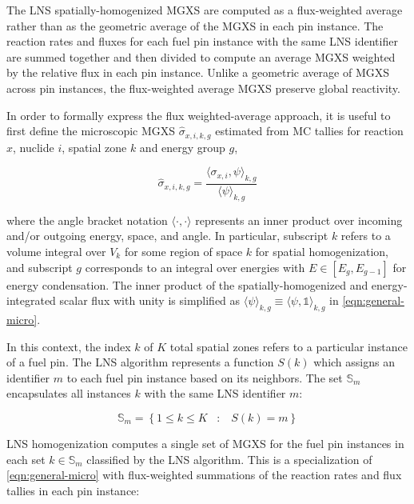 The LNS spatially-homogenized MGXS are computed as a flux-weighted average rather than as the geometric average of the MGXS in each pin instance. The reaction rates and fluxes for each fuel pin instance with the same LNS identifier are summed together and then divided to compute an average MGXS weighted by the relative flux in each pin instance. Unlike a geometric average of MGXS across pin instances, the flux-weighted average MGXS preserve global reactivity.


In order to formally express the flux weighted-average approach, it is useful to first define the microscopic MGXS $\hat{\sigma}_{x,i,k,g}$ estimated from MC tallies for reaction $x$, nuclide $i$, spatial zone $k$ and energy group $g$,

\begin{equation}
\label{eqn:general-micro}
\hat{\sigma}_{x,i,k,g} = \frac{\langle \sigma_{x,i}, \psi \rangle_{k,g}}{\langle \psi \rangle_{k,g}}
\end{equation}

\noindent where the angle bracket notation $\langle \cdot , \cdot \rangle$ represents an inner product over incoming and/or outgoing energy, space, and angle. In particular, subscript $k$ refers to a volume integral over $V_{k}$ for some region of space $k$ for spatial homogenization, and subscript $g$ corresponds to an integral over energies with $E \in [E_{g}, E_{g-1}]$ for energy condensation. The inner product of the spatially-homogenized and energy-integrated scalar flux with unity is simplified as $\langle \psi \rangle_{k,g} \equiv \langle \psi, \mathbb{1} \rangle_{k,g}$ in \autoref{eqn:general-micro}.

In this context, the index $k$ of $K$ total spatial zones refers to a particular instance of a fuel pin. The LNS algorithm represents a function $S(k)$ which assigns an identifier $m$ to each fuel pin instance based on its neighbors. The set $\mathbb{S}_{m}$ encapsulates all instances $k$ with the same LNS identifier $m$:

\begin{equation}
\label{eqn:lns-set}
\mathbb{S}_{m} = \left\{1 \le k \le K \;\;\; : \;\;\; S(k) = m\right\}
\end{equation}

LNS homogenization computes a single set of MGXS for the fuel pin instances in each set $k \in \mathbb{S}_{m}$ classified by the LNS algorithm. This is a specialization of \autoref{eqn:general-micro} with flux-weighted summations of the reaction rates and flux tallies in each pin instance:

